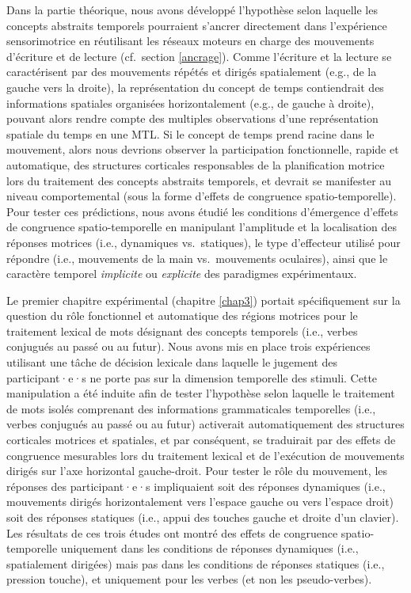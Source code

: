 \documentclass[
  a4paper,12pt,twoside,onecolumn,openright,final,oldfontcommands]{memoir}
\begin{document}
Dans la partie théorique, nous avons développé l'hypothèse selon laquelle les concepts abstraits temporels pourraient s'ancrer directement dans l'expérience sensorimotrice en réutilisant les réseaux moteurs en charge des mouvements d'écriture et de lecture (cf.~section \ref{ancrage}). Comme l'écriture et la lecture se caractérisent par des mouvements répétés et dirigés spatialement (e.g., de la gauche vers la droite), la représentation du concept de temps contiendrait des informations spatiales organisées horizontalement (e.g., de gauche à droite), pouvant alors rendre compte des multiples observations d'une représentation spatiale du temps en une MTL. Si le concept de temps prend racine dans le mouvement, alors nous devrions observer la participation fonctionnelle, rapide et automatique, des structures corticales responsables de la planification motrice lors du traitement des concepts abstraits temporels, et devrait se manifester au niveau comportemental (sous la forme d'effets de congruence spatio-temporelle). Pour tester ces prédictions, nous avons étudié les conditions d'émergence d'effets de congruence spatio-temporelle en manipulant l'amplitude et la localisation des réponses motrices (i.e., dynamiques vs.~statiques), le type d'effecteur utilisé pour répondre (i.e., mouvements de la main vs.~mouvements oculaires), ainsi que le caractère temporel \emph{implicite} ou \emph{explicite} des paradigmes expérimentaux.

Le premier chapitre expérimental (chapitre \ref{chap3}) portait spécifiquement sur la question du rôle fonctionnel et automatique des régions motrices pour le traitement lexical de mots désignant des concepts temporels (i.e., verbes conjugués au passé ou au futur). Nous avons mis en place trois expériences utilisant une tâche de décision lexicale dans laquelle le jugement des participant·e·s ne porte pas sur la dimension temporelle des stimuli. Cette manipulation a été induite afin de tester l'hypothèse selon laquelle le traitement de mots isolés comprenant des informations grammaticales temporelles (i.e., verbes conjugués au passé ou au futur) activerait automatiquement des structures corticales motrices et spatiales, et par conséquent, se traduirait par des effets de congruence mesurables lors du traitement lexical et de l'exécution de mouvements dirigés sur l'axe horizontal gauche-droit. Pour tester le rôle du mouvement, les réponses des participant·e·s impliquaient soit des réponses dynamiques (i.e., mouvements dirigés horizontalement vers l'espace gauche ou vers l'espace droit) soit des réponses statiques (i.e., appui des touches gauche et droite d'un clavier). Les résultats de ces trois études ont montré des effets de congruence spatio-temporelle uniquement dans les conditions de réponses dynamiques (i.e., spatialement dirigées) mais pas dans les conditions de réponses statiques (i.e., pression touche), et uniquement pour les verbes (et non les pseudo-verbes).
\end{document}
